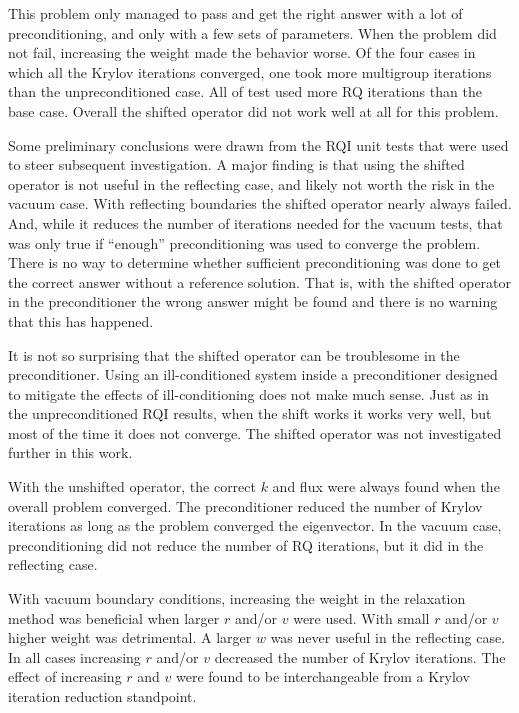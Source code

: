 This problem only managed to pass and get the right answer with a lot of preconditioning, and only with a few sets of parameters. When the problem did not fail, increasing the weight made the behavior worse. Of the four cases in which all the Krylov iterations converged, one took more multigroup iterations than the unpreconditioned case. All of test used more RQ iterations than the base case. Overall the shifted operator did not work well at all for this problem.

Some preliminary conclusions were drawn from the RQI unit tests that were used to steer subsequent investigation. A major finding is that using the shifted operator is not useful in the reflecting case, and likely not worth the risk in the vacuum case. With reflecting boundaries the shifted operator nearly always failed. And, while it reduces the number of iterations needed for the vacuum tests, that was only true if ``enough'' preconditioning was used to converge the problem. There is no way to determine whether sufficient preconditioning was done to get the correct answer without a reference solution. That is, with the shifted operator in the preconditioner the wrong answer might be found and there is no warning that this has happened. 

It is not so surprising that the shifted operator can be troublesome in the preconditioner. Using an ill-conditioned system inside a preconditioner designed to mitigate the effects of ill-conditioning does not make much sense. Just as in the unpreconditioned RQI results, when the shift works it works very well, but most of the time it does not converge. The shifted operator was not investigated further in this work.

With the unshifted operator, the correct $k$ and flux were always found when the overall problem converged. The preconditioner reduced the number of Krylov iterations as long as the problem converged the eigenvector. In the vacuum case, preconditioning did not reduce the number of RQ iterations, but it did in the reflecting case. 

With vacuum boundary conditions, increasing the weight in the relaxation method was beneficial when larger $r$ and/or $v$ were used. With small $r$ and/or $v$ higher weight was detrimental. A larger $w$ was never useful in the reflecting case. In all cases increasing $r$ and/or $v$ decreased the number of Krylov iterations. The effect of increasing $r$ and $v$ were found to be interchangeable from a Krylov iteration reduction standpoint. 

